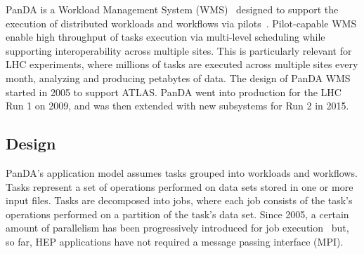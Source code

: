 %

PanDA is a Workload Management System (WMS)~\cite{marco2009glite} designed to
support the execution of distributed workloads and workflows via
pilots~\cite{turilli2015comprehensive}. Pilot-capable WMS enable high throughput
of tasks execution via multi-level scheduling while supporting interoperability
across multiple sites. This is particularly relevant for LHC experiments, where
millions of tasks are executed across multiple sites every month, analyzing and
producing petabytes of data. The design of PanDA WMS started in 2005 to support
ATLAS. PanDA went into production for the LHC Run 1 on 2009, and was then
extended with new subsystems for Run 2 in 2015.


\subsection{Design}
\label{ssec:panda_design}

PanDA's application model assumes tasks grouped into workloads and workflows.
Tasks represent a set of operations performed on data sets stored in one or more
input files. Tasks are decomposed into jobs, where each job consists of the
task's operations performed on a partition of the task's data set. Since 2005, a
certain amount of parallelism has been progressively introduced for job
execution~\cite{crooks2012multi} but, so far, HEP applications have not required
a message passing interface (MPI).

